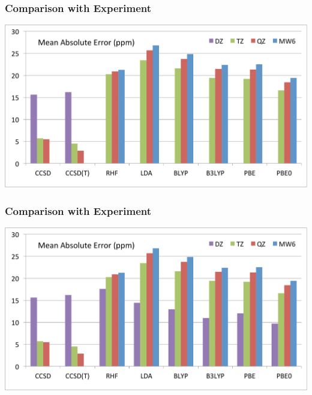 \begin{frame}
\frametitle{Comparison with Experiment}
\centering
\includegraphics[scale=0.3]{figures/mae_exp_3.pdf}
\end{frame}

\begin{frame}
\frametitle{Comparison with Experiment}
\centering
\includegraphics[scale=0.3]{figures/mae_exp_4.pdf}
\end{frame}
